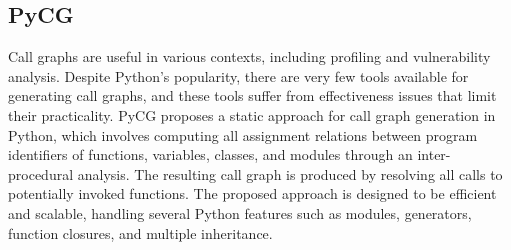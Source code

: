 \subsection{PyCG}
Call graphs are useful in various contexts, including profiling and vulnerability analysis.
Despite Python's popularity, there are very few tools available for generating call graphs, and these tools suffer from effectiveness issues that limit their practicality.
PyCG \cite{PyCG_2021} proposes a static approach for call graph generation in Python, which involves computing all assignment relations between program identifiers of functions, variables, classes, and modules through an inter-procedural analysis.
The resulting call graph is produced by resolving all calls to potentially invoked functions.
The proposed approach is designed to be efficient and scalable, handling several Python features such as modules, generators, function closures, and multiple inheritance.


